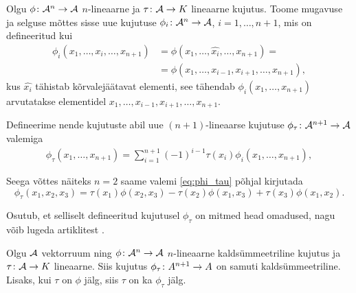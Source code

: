 Olgu $\phi \colon \mathcal{A}^n \to \mathcal{A}$ $n$-lineaarne ja
$\tau \colon \mathcal{A} \to K$ lineaarne kujutus. Toome mugavuse
ja selguse mõttes sisse uue kujutuse $\phi_i \colon \mathcal{A}^n \to \mathcal{A}$,
$i = 1, \dots, n+1$, mis on defineeritud kui
\begin{align*}
    \phi_i\left(x_1, \dots, x_i, \dots, x_{n+1}\right) &=
    \phi \left(x_1, \dots, \hat{x_i}, \dots, x_{n+1}\right) = \\
    &= \phi \left(x_1, \dots, x_{i-1}, x_{i+1}, \dots, x_{n+1}\right),
\end{align*}
kus $\hat{x_i}$ tähistab kõrvalejäätavat elementi, see tähendab
$\phi_i(x_1, \dots, x_{n+1})$ arvutatakse elementidel
$x_1, \dots, x_{i-1}, x_{i+1}, \dots, x_{n+1}$.

Defineerime nende
kujutuste abil uue $(n+1)$-lineaarse kujutuse
$\phi_\tau \colon \mathcal{A}^{n+1} \to \mathcal{A}$ valemiga
\begin{align}\label{eq:phi_tau}
    \phi_\tau \left( x_1, \dots, x_{n+1} \right) =
    \sum_{i=1}^{n+1} (-1)^{i-1} \tau(x_i)
        \phi_i(x_1, \dots, x_{n+1}),
\end{align}


Seega võttes näiteks $n = 2$ saame valemi \eqref{eq:phi_tau}
põhjal kirjutada
\[
    \phi_\tau (x_1, x_2, x_3) =
        \tau(x_1) \phi(x_2, x_3) -
        \tau(x_2) \phi(x_1, x_3) +
        \tau(x_3) \phi(x_1, x_2).
\]

Osutub, et selliselt defineeritud kujutusel $\phi_\tau$ on
mitmed head omadused, nagu võib lugeda artiklitest \cite{AKMS:2014,AMS:2011}.

\begin{lemma}
    Olgu $\mathcal{A}$ vektorruum ning $\phi \colon \mathcal{A}^n \to \mathcal{A}$ $n$-lineaarne
    kaldsümmeetriline kujutus ja $\tau \colon \mathcal{A} \to K$ lineaarne.
    Siis kujutus $\phi_\tau \colon A^{n+1} \to A$ on samuti
    kaldsümmeetriline. Lisaks, kui $\tau$ on $\phi$ jälg, siis
    $\tau$ on ka $\phi_\tau$ jälg.
\end{lemma}


